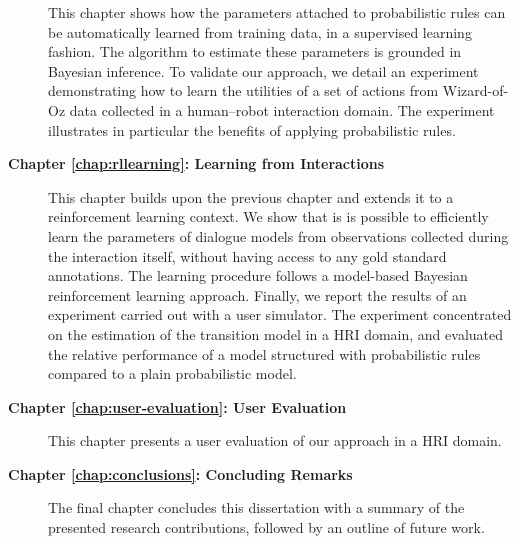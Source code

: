 \begin{description}
 This chapter shows how the parameters attached to probabilistic rules can be automatically learned from training data, in a supervised learning fashion. The algorithm to estimate these parameters is grounded in Bayesian inference.  To validate our approach, we detail an experiment demonstrating how to learn the utilities of a set of actions from Wizard-of-Oz data collected in a human--robot interaction domain.  The experiment illustrates in particular the benefits of applying probabilistic rules.  \vspace{2mm}

\item [\textbf{Chapter \ref{chap:rllearning}: Learning from Interactions}] \hfill  \vspace{2mm}

This chapter builds upon the previous chapter and extends it to a reinforcement learning context.  We show that is is possible to efficiently learn the parameters of dialogue models from observations collected during the interaction itself, without having access to any gold standard annotations.  The learning procedure follows a model-based Bayesian reinforcement learning approach. Finally, we report the results of an experiment carried out with a user simulator.  The experiment concentrated on the estimation of the transition model in a HRI domain, and evaluated the relative performance of a  model structured with probabilistic rules compared to a plain probabilistic model.   \vspace{2mm}

\item [\textbf{Chapter \ref{chap:user-evaluation}: User Evaluation}] \hfill  \vspace{2mm}

This chapter presents a user evaluation of our approach in a HRI domain.     \vspace{2mm}

\item [\textbf{Chapter \ref{chap:conclusions}: Concluding Remarks}] \hfill  \vspace{2mm}

The final chapter concludes this dissertation with a summary of the presented research contributions, followed by an outline of future work.   \vspace{2mm}

\end{description}

